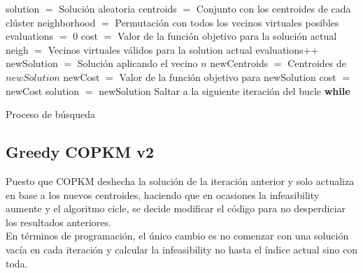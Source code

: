 \begin{algorithm}[H]
    \SetAlgoLined
        solution $=$ Solución aleatoria \;
        centroids $=$ Conjunto con los centroides de cada clúster \;
        neighborhood $=$ Permutación con todos los vecinos virtuales posibles \;
        evaluations $=$ 0 \;
        cost $=$ Valor de la función objetivo para la solución actual \;
         {
            neigh $=$ Vecinos virtuales válidos para la solution actual \;
             {
                evaluations++ \;
                newSolution $=$ Solución aplicando el vecino $n$ \;
                newCentroids $=$ Centroides de $newSolution$ \;
                newCost $=$ Valor de la función objetivo para newSolution \;
                 {
                    cost $=$ newCost \;
                    solution $=$ newSolution \;
                    Saltar a la siguiente iteración del bucle \textbf{while} \;
                }
            }
        }
    \caption{Proceso de búsqueda}
\end{algorithm}

\newpage


\subsection{Greedy COPKM v2}

Puesto que COPKM deshecha la solución de la iteración anterior y solo actualiza en base a los nuevos centroides, haciendo que en ocasiones la infeasibility aumente y el algoritmo cicle, se decide modificar el código para no desperdiciar los resultados anteriores. \\

En términos de programación, el único cambio es no comenzar con una solución vacía en cada iteración y calcular la infeasibility no hasta el índice actual sino con toda. \\

